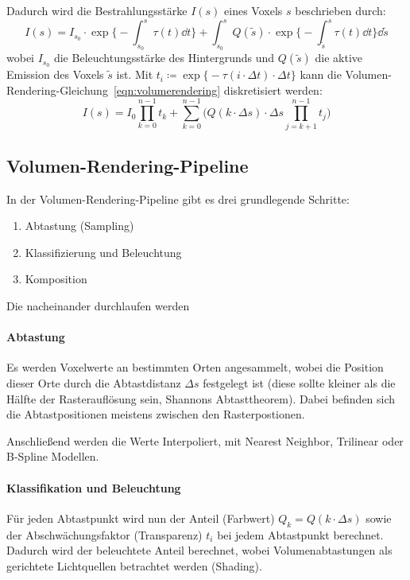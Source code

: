 			Dadurch wird die Bestrahlungsstärke \( I(s) \) eines Voxels \(s\) beschrieben durch:
			\begin{equation}
				I(s) = I_{s_0} \cdot \exp \Bigg\{ -\int_{s_0}^{s} \! \tau(t) \dd{t} \Bigg\} + \int_{s_0}^{s} \! Q(\tilde{s}) \cdot \exp \Bigg\{ -\int_{\tilde{s}}^{s} \tau(t) \dd{t} \Bigg\} \dd{\tilde{s}}  \label{eqn:volumerendering}
			\end{equation}
			wobei \( I_{s_0} \) die Beleuchtungsstärke des Hintergrunds und \( Q(\tilde{s}) \) die aktive Emission des Voxels \( \tilde{s} \) ist. Mit \( t_i \coloneqq \exp\Big\{ -\tau(i \cdot \Delta t) \cdot \Delta t \Big\} \) kann die Volumen-Rendering-Gleichung~\ref{eqn:volumerendering} diskretisiert werden:
			\begin{equation}
				I(s) = I_0 \prod_{k = 0}^{n - 1} t_k + \sum_{k = 0}^{n - 1} \Bigg( Q(k \cdot \Delta s) \cdot \Delta s \prod_{j = k + 1}^{n - 1} t_j \Bigg)  \label{eqn:volumerenderingdiscrete}
			\end{equation}

		\subsection{Volumen-Rendering-Pipeline}
			In der Volumen-Rendering-Pipeline gibt es drei grundlegende Schritte:
			\begin{enumerate}
				\item Abtastung (Sampling)
				\item Klassifizierung und Beleuchtung
				\item Komposition
			\end{enumerate}
			Die nacheinander durchlaufen werden

			\paragraph{Abtastung}
				Es werden Voxelwerte an bestimmten Orten angesammelt, wobei die Position dieser Orte durch die Abtastdistanz \( \Delta s \) festgelegt ist (diese sollte kleiner als die Hälfte der Rasterauflösung sein, Shannons Abtasttheorem). Dabei befinden sich die Abtastpositionen meistens zwischen den Rasterpostionen.
				
				Anschließend werden die Werte Interpoliert, \bspw mit Nearest Neighbor, Trilinear oder B-Spline Modellen.

			\paragraph{Klassifikation und Beleuchtung}
				Für jeden Abtastpunkt wird nun der Anteil (Farbwert) \( Q_k = Q(k \cdot \Delta s) \) sowie der Abschwächungsfaktor (Transparenz) \( t_i \) bei jedem Abtastpunkt berechnet. Dadurch wird der beleuchtete Anteil berechnet, wobei Volumenabtastungen als gerichtete Lichtquellen betrachtet werden (Shading).

